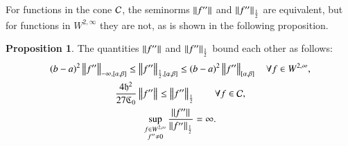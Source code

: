 \documentclass[review]{elsarticle}
\theoremstyle{definition}
\renewcommand{\cw}{W}
\newtheorem{prop}[theorem]{Proposition}
\begin{document}
For functions in the cone $\cc$, the seminorms $\norm{f''}$ and $\norm[\frac
12]{f''}$ are equivalent, but  for functions in $ \cw^{2,\infty}$ they are not, as is shown in the following proposition.

\begin{prop} \label{equivnormprop} 
	The quantities $\norm{f''}$ and $\norm[\frac 12]{f''}$ bound each other as follows:
	\begin{subequations}
		\begin{gather}
		\label{halflessinf}
		(b-a)^2\norm[-\infty,{[\alpha,\beta]}]{f''}  \le \norm[\frac 12,{[\alpha,\beta]}]{f''}  
		\le (b-a)^2 \norm[{[\alpha,\beta]}]{f''} \quad \forall f \in \cw^{2,\infty}, \\
		\label{inflesshalf}
		\frac{4\fh^2}{27\fC_0} \norm{f''} \le \norm[\frac 12]{f''} \qquad \forall f \in \cc, \\
		\label{infhalfnoteq}
		\sup_{\substack{f \in \cw^{2,\infty}\\ f'' \ne 0}}  \frac{\norm{f''}}{\norm[\frac 12]{f''}} 
		= \infty.
		\end{gather}
	\end{subequations}
\end{prop}
\end{document}
